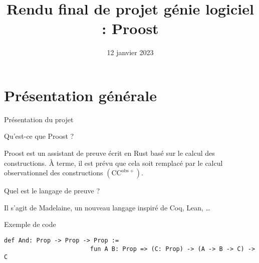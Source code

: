 \documentclass[12pt, aspectratio=169]{beamer}
\title[Rendu final : Proost]{Rendu final de projet génie logiciel : Proost}
\author[Projet génie logiciel]{
    \normalsize
    Arthur~Adjedj \and 
    Augustin~Albert \and \\
    Vincent~Lafeychine \and
    Lucas~Tabary-Maujean \and \\ \vspace{0.2cm}
    {\footnotesize
      Jean~Abou-Samra \and
      Tanguy~Bozec \and
      Antonin~Bretagne \and
      Vivien~Ducros \and
      Antoine~Guilmin-Crépon \and
      Balthazar~Patiachvili}
}
\date{12 janvier 2023}
\institute[]{ENS Paris-Saclay}
\begin{document}
    \beamertemplatenavigationsymbolsempty
    \maketitle

    \section{Présentation générale}

        \begin{frame}[fragile]{Présentation du projet}
        
            \begin{block}{Qu'est-ce que Proost ?}
                
                Proost est un assistant de preuve écrit en Rust basé sur le calcul des constructions. À terme, il est prévu que cela soit remplacé par le calcul observationnel des constructions $\left(\mathrm{CC}^{\mathrm{obs}+}\right)$.

            \end{block} \pause

            \begin{block}{Quel est le langage de preuve ?}
                
                Il s'agit de Madelaine, un nouveau langage inspiré de Coq, Lean, \dots

            \end{block} \pause

            \begin{exampleblock}{Exemple de code}
                
                \begin{lstlisting}[language=mdln]
                    def And: Prop -> Prop -> Prop :=
                        fun A B: Prop => (C: Prop) -> (A -> B -> C) -> C
                \end{lstlisting}

            \end{exampleblock}

        \end{frame}
\end{document}
